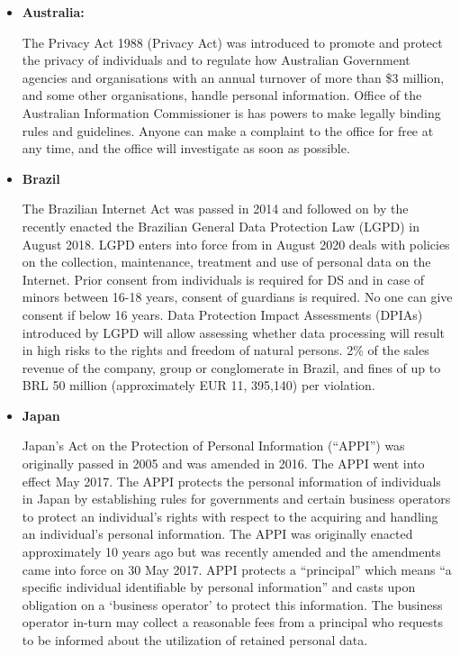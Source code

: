 \begin{multicols}{2}
\begin{itemize}
\item[{\bf 2)}] \textbf{Australia:}

The Privacy Act 1988 (Privacy Act) was introduced to promote and protect the privacy of individuals and to regulate how Australian Government agencies and organisations with an annual turnover of more than \$3 million, and some other organisations, handle personal information. Office of the Australian Information Commissioner is has powers to make legally binding rules and guidelines. Anyone can make a complaint to the office for free at any time, and the office will investigate as soon as possible. 

\item[{\bf 3)}] \textbf{Brazil}

The Brazilian Internet Act was passed in 2014 and followed on by the recently enacted the Brazilian General Data Protection Law (LGPD) in August 2018. LGPD enters into force from in August 2020   deals with policies on the collection, maintenance, treatment and use of personal data on the Internet. Prior consent from individuals is required for DS and in case of minors between 16-18 years, consent of guardians is required. No one can give consent if below 16 years. Data Protection Impact Assessments (DPIAs) introduced by LGPD will allow assessing whether data processing will result in high risks to the rights and freedom of natural persons. 2\% of the sales revenue of the company, group or conglomerate in Brazil, and fines of up to BRL 50 million (approximately EUR 11, 395,140) per violation. 

\item[{\bf 4)}] \textbf{Japan}

Japan’s Act on the Protection of Personal Information (“APPI”) was originally passed in 2005 and was amended in 2016. The APPI went into effect May 2017. The APPI protects the personal information of individuals in Japan by establishing rules for governments and certain business operators to protect an individual’s rights with respect to the acquiring and handling an individual’s personal information. The APPI was originally enacted approximately 10 years ago but was recently amended and the amendments came into force on 30 May 2017.  APPI protects a “principal” which means “a specific individual identifiable by personal information” and casts upon obligation on a ‘business operator’ to protect this information. The business operator in-turn may collect a reasonable fees from a principal who requests to be informed about the utilization of retained personal data.


\end{itemize}
\end{multicols}
